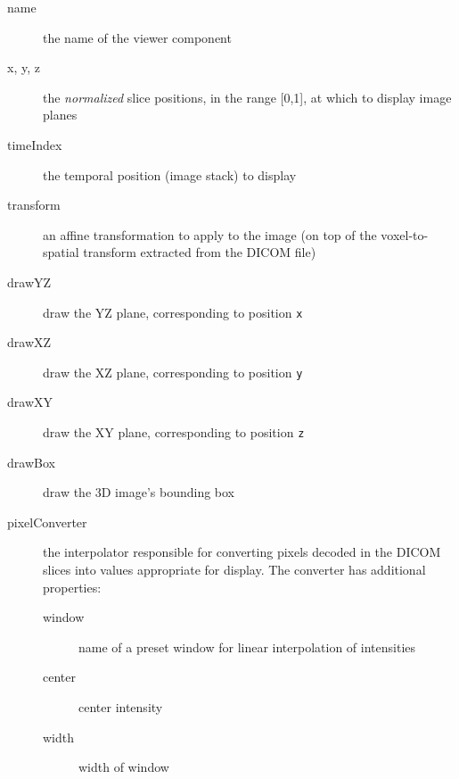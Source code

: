 \begin{description}

\item[name]\mbox{}

the name of the viewer component

\item[x, y, z]\mbox{}

the \emph{normalized} slice positions, in the range [0,1], at which to
display image planes

\item[timeIndex]\mbox{}

the temporal position (image stack) to display

\item[transform]\mbox{}

an affine transformation to apply to the image (on
top of the voxel-to-spatial transform extracted from the DICOM file)

\item[drawYZ]\mbox{}

draw the YZ plane, corresponding to position \texttt{x}

\item[drawXZ]\mbox{}

draw the XZ plane, corresponding to position \texttt{y}

\item[drawXY]\mbox{}

draw the XY plane, corresponding to position \texttt{z}

\item[drawBox]\mbox{}

draw the 3D image's bounding box

\item[pixelConverter]\mbox{}

the interpolator responsible for converting pixels
decoded in the DICOM slices into values appropriate for display.
The converter has additional properties:

\begin{description}

\item[window]\mbox{}

name of a preset window for linear interpolation of intensities

\item[center]\mbox{}

center intensity

\item[width]\mbox{}

width of window

\end{description}

\end{description}

